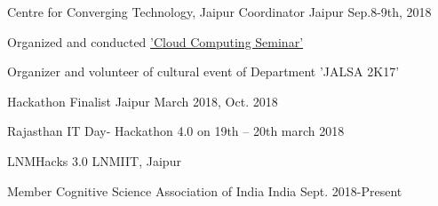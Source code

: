 \vspace{-0.3cm}


\begin{cventries}

  \extraentry
  {Centre for Converging Technology, Jaipur}
  {Coordinator}
  {Jaipur}
  {Sep.8-9th, 2018}
  {
    \begin{cvitems}
    \item Organized and conducted \href{https://drive.google.com/file/d/1PDJYCQRCsk0e_HojYzUzvAWycQPXnXpg/view?usp=sharing}{'Cloud Computing Seminar'}
    \item Organizer and volunteer of cultural event of Department 'JALSA 2K17'
    \end{cvitems}
  }



  \extraentry{}
  {Hackathon Finalist}
  {Jaipur}
  {March 2018, Oct. 2018}
  {
    \begin{cvitems}
    \item Rajasthan IT Day- Hackathon 4.0 on 19th – 20th march 2018
    \item LNMHacks 3.0 LNMIIT, Jaipur
    \end{cvitems}
  }

  \extraentry
  {Member}
  {Cognitive Science Association of India}
  {India}
  {Sept. 2018-Present}
  {}

  \vspace{-0.3cm}


\end{cventries}

